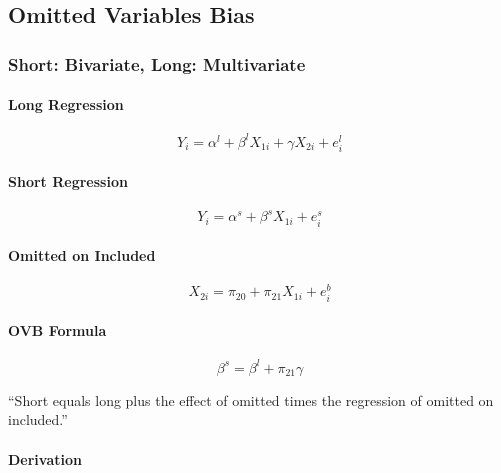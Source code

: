 \documentclass[11pt]{article}
\begin{document}

\subsection{Omitted Variables Bias}

\subsubsection{Short: Bivariate, Long: Multivariate}

\paragraph*{Long Regression}
\begin{equation}
Y_{i}=\alpha^{l}+\beta^{l} X_{1 i}+\gamma X_{2 i}+e_{i}^{l}
\end{equation}

\paragraph*{Short Regression}
\begin{equation}
Y_{i}=\alpha^{s}+\beta^{s} X_{1 i}+e_{i}^{s}
\end{equation}

\paragraph*{Omitted on Included}
\begin{equation}
	X_{2i} = \pi_{20} + \pi_{21} X_{1i} + e^{b}_i
\end{equation}

\paragraph*{OVB Formula}
\begin{equation}
\beta^{s}=\beta^{l}+\pi_{21} \gamma
\end{equation}

\begin{remark}
	``Short equals long plus the effect of omitted times the regression of omitted on included.''
\end{remark}

\paragraph*{Derivation}
\end{document}

